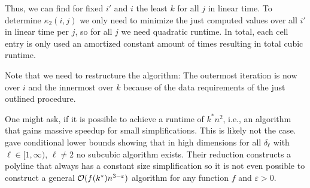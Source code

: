 Thus, we can find for fixed \(i'\) and \(i\) the least \(k\) for all \(j\) in linear time. To determine \(\kappa_2(i, j)\) we only need to minimize the just computed values over all \(i'\) in linear time per \(j\), so for all \(j\) we need quadratic runtime. In total, each cell entry is only used an amortized constant amount of times resulting in total cubic runtime. 

Note that we need to restructure the algorithm: The outermost iteration is now over \(i\) and the innermost over \(k\) because of the data requirements of the just outlined procedure. 

One might ask, if it is possible to achieve a runtime of \(k^*n^2\), i.e., an algorithm that gains massive speedup for small simplifications. This is likely not the case. \citeauthor{polyline_simplification_has_cubic_complexity_bringmannetal} gave conditional lower bounds showing that in high dimensions for all \(\delta_\ell\) with \(\ell \in [1, \infty)\), \(\ell \neq 2\) no subcubic algorithm exists. Their reduction constructs a polyline that always has a constant size simplification so it is not even possible to construct a general \(\mathcal{O}(f(k^*)n^{3-\varepsilon})\) algorithm for any function \(f\) and \(\varepsilon > 0\).







